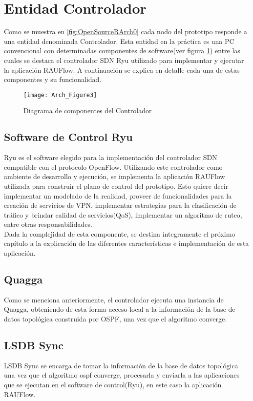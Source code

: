\section{Entidad Controlador}
Como se muestra en \ref{fig:OpenSourceRArch0} cada nodo del prototipo responde a una entidad denominada Controlador. Esta entidad en la pr\'actica es una PC convencional con determinadas componentes de software(ver figura \ref{fig:OpenSourceRArch3}) entre las cuales se destaca el controlador SDN Ryu utilizado para implementar y ejecutar la aplicaci\'on RAUFlow. A continuación se explica en detalle cada una de estas componentes y su funcionalidad.

\newpage
\begin{figure}[htbp!] 
\centering    
\texttt{[image: Arch\_Figure3]}
\caption[OpenSourceRArch3]{Diagrama de componentes del Controlador}
\label{fig:OpenSourceRArch3}
\end{figure}


\subsection{Software de Control Ryu}
Ryu es el software elegido para la implementaci\'on del controlador SDN compatible con el protocolo OpenFlow. Utilizando este controlador como ambiente de desarrollo y ejecuci\'on, se implementa la aplicaci\'on RAUFlow utilizada para construir el plano de control del prototipo. Esto quiere decir implementar un modelado de la realidad, proveer de funcionalidades para la creaci\'on de servicios de VPN, implementar estrategias para la clasificaci\'on de tr\'afico y brindar calidad de servicios(QoS), implementar un algoritmo de ruteo, entre otras responsabilidades.\\ 

Dada la complejidad de esta componente, se destina íntegramente el próximo cap\'itulo a la explicaci\'on de las diferentes características e implementaci\'on de esta aplicaci\'on. 

\subsection{Quagga}
Como se menciona anteriormente, el controlador ejecuta una instancia de Quagga, obteniendo de esta forma acceso local a la información de la base de datos topol\'ogica construida por OSPF, una vez que el algoritmo converge.

\subsection{LSDB Sync}
LSDB Sync se encarga de tomar la información de la base de datos topol\'ogica una vez que el algoritmo ospf converge, procesarla y enviarla a las aplicaciones que se ejecutan en el software de control(Ryu), en este caso la aplicación RAUFlow.\\

